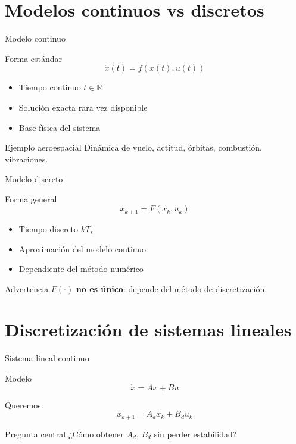 \documentclass[aspectratio=169,10pt]{beamer}
\newcommand{\importantbox}[2][Importante]{%
\begin{alertblock}{#1}#2\end{alertblock}}
\begin{document}
\section{Modelos continuos vs discretos}

\begin{frame}{Modelo continuo}
\small
\begin{block}{Forma estándar}
\[
\dot{x}(t) = f(x(t),u(t))
\]
\end{block}

\begin{itemize}
\item Tiempo continuo $t \in \mathbb{R}$
\item Solución exacta rara vez disponible
\item Base física del sistema
\end{itemize}

\importantbox[Ejemplo aeroespacial]{
Dinámica de vuelo, actitud, órbitas, combustión, vibraciones.
}
\end{frame}

\begin{frame}{Modelo discreto}
\small
\begin{block}{Forma general}
\[
x_{k+1} = F(x_k, u_k)
\]
\end{block}

\begin{itemize}
\item Tiempo discreto $kT_s$
\item Aproximación del modelo continuo
\item Dependiente del método numérico
\end{itemize}

\importantbox[Advertencia]{
$F(\cdot)$ \textbf{no es único}: depende del método de discretización.
}
\end{frame}

\section{Discretización de sistemas lineales}

\begin{frame}{Sistema lineal continuo}
\small
\begin{block}{Modelo}
\[
\dot{x} = A x + B u
\]
\end{block}

Queremos:
\[
x_{k+1} = A_d x_k + B_d u_k
\]

\importantbox[Pregunta central]{
¿Cómo obtener $A_d$, $B_d$ sin perder estabilidad?
}
\end{frame}
\end{document}
